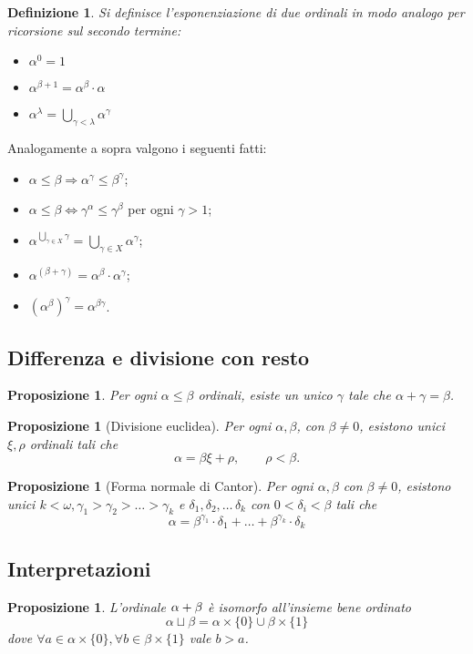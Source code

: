 \documentclass[a4paper,10pt,oneside]{article}
\theoremstyle{plain}
\newtheorem{mydef}[mytheorem]{Definizione}
\newtheorem{myprop}[mytheorem]{Proposizione}
\theoremstyle{definition}
\theoremstyle{remark}
\begin{document}
\begin{mydef} Si definisce l'esponenziazione di due ordinali in modo analogo per ricorsione sul secondo termine:
\begin{itemize}
   \item $\alpha^0 = 1$
   \item $\alpha^{\beta+1} =\alpha^\beta\cdot\alpha$
   \item $\alpha^\lambda= \bigcup_{\gamma<\lambda}\alpha^\gamma$  
\end{itemize}
\end{mydef}

Analogamente a sopra valgono i seguenti fatti:
\begin{itemize}
 \item $\alpha \le \beta \Rightarrow \alpha^\gamma \le \beta^\gamma$;
 \item $\alpha \le \beta \Leftrightarrow \gamma^\alpha\le \gamma^\beta$ per ogni $\gamma > 1$;
 \item $\alpha^{\bigcup_{\gamma \in X}\gamma} = \bigcup_{\gamma \in X} \alpha^\gamma$;
 \item $\alpha^{(\beta+\gamma)}=\alpha^\beta\cdot\alpha^\gamma$;
 \item $(\alpha^\beta)^\gamma=\alpha^{\beta\gamma}$.
\end{itemize}
\noindent


\subsection{Differenza e divisione con resto}
\begin{myprop}
Per ogni $\alpha \le \beta$ ordinali, esiste un unico $\gamma$ tale che $\alpha + \gamma=\beta$.
\end{myprop}

\begin{myprop}[Divisione euclidea]
 Per ogni $\alpha, \beta$, con $\beta \ne 0$, esistono unici $\xi, \rho$ ordinali tali che \[\alpha = \beta \xi + \rho, \qquad \rho < \beta.\]
\end{myprop}

\begin{myprop}[Forma normale di Cantor]
 Per ogni $\alpha,\beta$ con $\beta \ne 0$, esistono unici $k<\omega, \gamma_1>\gamma_2>\dots>\gamma_k$ e $\delta_1,\delta_2,\dots\,\delta_k$ con $0<\delta_i<\beta$ tali che 
 \[\alpha = \beta^{\gamma_1}\cdot \delta_1 + \dots +\beta^{\gamma_k}\cdot \delta_k\]
\end{myprop}

\subsection{Interpretazioni}
\begin{myprop}
 L'ordinale $\alpha + 
\noindent
\beta$ è isomorfo all'insieme bene ordinato 
 \[\alpha \sqcup \beta= \alpha \times \{0\} \cup \beta \times \{1\}\]
 dove $\forall a\in \alpha \times\{0\}, \forall b \in \beta \times \{1\}$ vale $b>a$.
\end{myprop}
\end{document}
